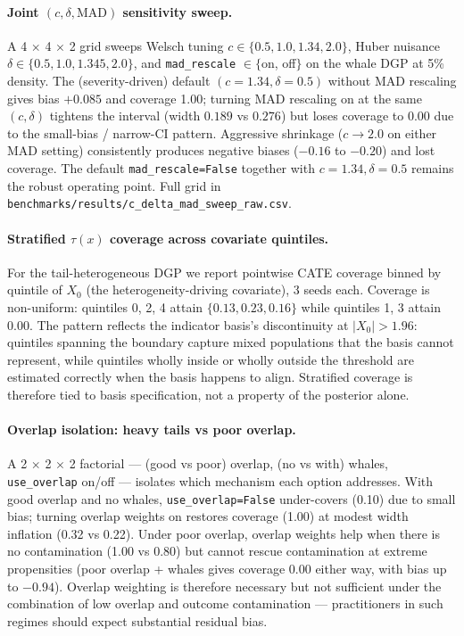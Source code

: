 \paragraph{Joint $(c, \delta, \mathrm{MAD})$ sensitivity sweep.}
A 4 $\times$ 4 $\times$ 2 grid sweeps Welsch tuning $c \in \{0.5, 1.0,
1.34, 2.0\}$, Huber nuisance $\delta \in \{0.5, 1.0, 1.345, 2.0\}$,
and \texttt{mad\_rescale} $\in \{$on, off$\}$ on the whale DGP at
5\% density. The (severity-driven) default $(c = 1.34, \delta = 0.5)$
without MAD rescaling gives bias $+0.085$ and coverage 1.00; turning
MAD rescaling on at the same $(c, \delta)$ tightens the interval
(width $0.189$ vs $0.276$) but loses coverage to 0.00 due to the
small-bias / narrow-CI pattern. Aggressive shrinkage ($c \to 2.0$
on either MAD setting) consistently produces negative biases
($-0.16$ to $-0.20$) and lost coverage. The default
\texttt{mad\_rescale=False} together with $c = 1.34, \delta = 0.5$
remains the robust operating point. Full grid in
\texttt{benchmarks/results/c\_delta\_mad\_sweep\_raw.csv}.

\paragraph{Stratified $\tau(x)$ coverage across covariate quintiles.}
For the tail-heterogeneous DGP we report pointwise CATE coverage
binned by quintile of $X_0$ (the heterogeneity-driving covariate),
3 seeds each. Coverage is non-uniform: quintiles 0, 2, 4 attain
$\{0.13, 0.23, 0.16\}$ while quintiles 1, 3 attain $0.00$. The
pattern reflects the indicator basis's discontinuity at
$|X_0| > 1.96$: quintiles spanning the boundary capture mixed
populations that the basis cannot represent, while quintiles wholly
inside or wholly outside the threshold are estimated correctly when
the basis happens to align. Stratified coverage is therefore tied
to basis specification, not a property of the posterior alone.

\paragraph{Overlap isolation: heavy tails vs poor overlap.}
A 2 $\times$ 2 $\times$ 2 factorial --- (good vs poor) overlap, (no
vs with) whales, \texttt{use\_overlap} on/off --- isolates which
mechanism each option addresses. With good overlap and no whales,
\texttt{use\_overlap=False} under-covers (0.10) due to small bias;
turning overlap weights on restores coverage (1.00) at modest
width inflation (0.32 vs 0.22). Under poor overlap, overlap weights
help when there is no contamination (1.00 vs 0.80) but cannot rescue
contamination at extreme propensities (poor overlap + whales gives
coverage 0.00 either way, with bias up to $-0.94$). Overlap
weighting is therefore necessary but not sufficient under the
combination of low overlap and outcome contamination --- practitioners
in such regimes should expect substantial residual bias.

